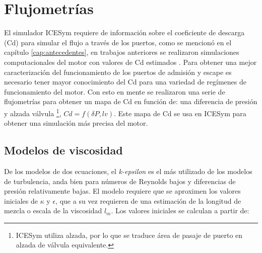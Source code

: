 \chapter{Flujometrías}
%
El simulador ICESym requiere de información sobre el coeficiente de descarga
(Cd) para simular el flujo a través de los puertos, como se mencionó en el
capítulo \ref{cap:antecedentes}, en trabajos anteriores se realizaron
simulaciones computacionales del motor con valores de Cd estimados
\cite{lopez13}.
%
Para obtener una mejor caracterización del funcionamiento de los puertos de
admisión y escape es necesario tener mayor conocimiento del Cd para una
variedad de regímenes de funcionamiento del motor.
%
Con esto en mente se realizaron una serie de flujometrías para obtener un mapa
de Cd en función de: una diferencia de presión y alzada válvula \footnote{ICESym
utiliza alzada, por lo que se traduce área de pasaje de puerto en alzada de
válvula equivalente.}, $Cd = f(\delta P,lv)$.
%
Este mapa de Cd se usa en ICESym para obtener una simulación más precisa del
motor.

%

\section{Modelos de viscosidad}
%


De los modelos de dos ecuaciones, el \emph{k-epsilon} es el más utilizado
de los modelos de turbulencia, anda bien para números de Reynolds bajos y
diferencias de presión relativamente bajas.
%
El modelo requiere que se aproximen los valores iniciales de $\kappa$ y
$\epsilon$, que a su vez requieren de una estimación de la longitud de mezcla o
escala de la viscosidad $l_m$.
%
Los valores iniciales se calculan a partir de:


